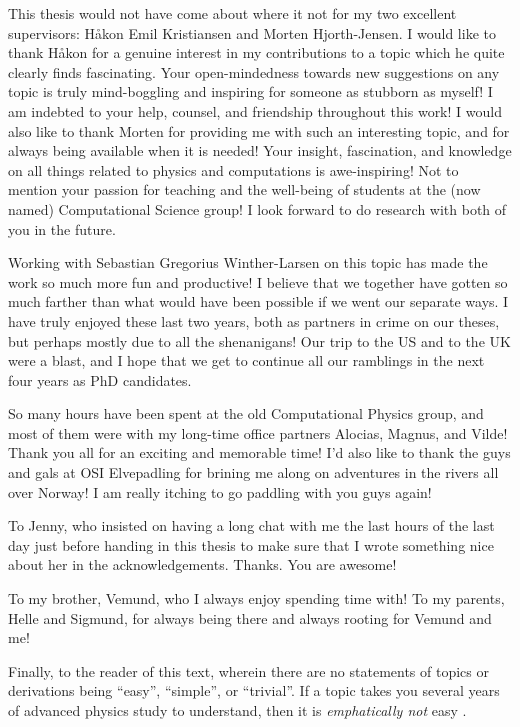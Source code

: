 This thesis would not have come about where it not for my two excellent
supervisors: Håkon Emil Kristiansen and Morten Hjorth-Jensen.
I would like to thank Håkon for a genuine interest in my contributions to a
topic which he quite clearly finds fascinating.
Your open-mindedness towards new suggestions on any topic is truly mind-boggling
and inspiring for someone as stubborn as myself!
I am indebted to your help, counsel, and friendship throughout this work!
I would also like to thank Morten for providing me with such an interesting
topic, and for always being available when it is needed!
Your insight, fascination, and knowledge on all things related to physics and
computations is awe-inspiring!
Not to mention your passion for teaching and the well-being of students at the
(now named) Computational Science group!
I look forward to do research with both of you in the future.

Working with Sebastian Gregorius Winther-Larsen on this topic has made the work
so much more fun and productive!
I believe that we together have gotten so much farther than what would have been
possible if we went our separate ways.
I have truly enjoyed these last two years, both as partners in crime on our
theses, but perhaps mostly due to all the shenanigans!
Our trip to the US and to the UK were a blast, and I hope that we get to
continue all our ramblings in the next four years as PhD candidates.

So many hours have been spent at the old Computational Physics group, and most
of them were with my long-time office partners Alocias, Magnus, and Vilde!
Thank you all for an exciting and memorable time!
I'd also like to thank the guys and gals at OSI Elvepadling for brining me along
on adventures in the rivers all over Norway!
I am really itching to go paddling with you guys again!

To Jenny, who insisted on having a long chat with me the last hours of the last
day just before handing in this thesis to make sure that I wrote something nice
about her in the acknowledgements.
Thanks.
You are awesome!

To my brother, Vemund, who I always enjoy spending time with!
To my parents, Helle and Sigmund, for always being there and always rooting for
Vemund and me!

Finally, to the reader of this text, wherein there are no statements of topics
or derivations being ``easy'', ``simple'', or ``trivial''.
If a topic takes you several years of advanced physics study to understand, then
it is \emph{emphatically not} easy \cite{nontrivial-manifesto}.
